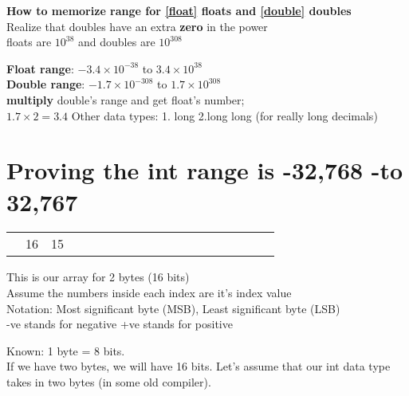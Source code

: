 \documentclass{article}
\begin{document}
\textbf{How to memorize range for \ref{float} floats and \ref{double} doubles} \\
Realize that doubles have an extra \textbf{zero} in the power \\
floats are \textbf{$10^{38}$} and doubles are \textbf{$10^{308}$}

\textbf{Float range}: $-3.4 \times 10^{-38}$ to $3.4 \times 10^{38}$ \\
\textbf{Double range}:  $-1.7 \times 10^{-308}$ to $1.7 \times 10^{308}$ \\
\textbf{multiply} double's range and get float's number;  \\
$1.7 \times 2 = 3.4$
Other data types: 1. long 2.long long (for really long decimals)


\section{Proving the int range is {-32,768 -to 32,767} } 
\begin{table}
\centering
\begin{tabular}{lllllllllllllllllll}
 &16  &15  &  &  &  &  &  &  &  &  &  &  &  &  &  &   
\end{tabular}
\end{table}

This is our array for 2 bytes (16 bits) \\
Assume the numbers inside each index are it's index value \\
Notation:
Most significant byte (MSB), Least significant byte (LSB) \\
-ve stands for negative
+ve stands for positive

Known: 1 byte = 8 bits. \\
If we have two bytes, we will have 16 bits. Let's assume that our int data type takes in two bytes (in some old compiler).

\setcounter{nodeidx}{1}
\newcommand{\nodes}[1]{%
    \foreach \num in {#1}{
      \node[minimum size=6mm, draw, rectangle] (\arabic{nodeidx}) at (\arabic{nodeidx},0) {\num};
      \stepcounter{nodeidx}
    }
}
\newcommand{\brckt}[4]{%
  \draw (#1.south west) ++($(-.1, -.1) + (-.1*#3, 0)$) -- ++($(0,-.1) + (0,-#3*1.25em)$) -- node [below] {#4} ($(#2.south east) + (.1,-.1) + (.1*#3, 0) + (0,-.1) + (0,-#3*1.25em)$) -- ++($(0,#3*1.25em) + (0,.1)$);%
}
\end{document}
